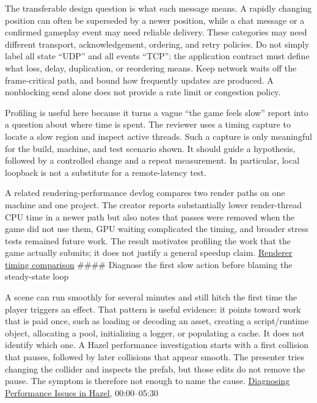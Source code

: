 The transferable design question is what each message means. A rapidly changing position can often be superseded by a newer position, while a chat message or a confirmed gameplay event may need reliable delivery. These categories may need different transport, acknowledgement, ordering, and retry policies. Do not simply label all state ``UDP'' and all events ``TCP'': the application contract must define what loss, delay, duplication, or reordering means. Keep network waits off the frame-critical path, and bound how frequently updates are produced. A nonblocking send alone does not provide a rate limit or congestion policy.

Profiling is useful here because it turns a vague ``the game feels slow'' report into a question about where time is spent. The reviewer uses a timing capture to locate a slow region and inspect active threads. Such a capture is only meaningful for the build, machine, and test scenario shown. It should guide a hypothesis, followed by a controlled change and a repeat measurement. In particular, local loopback is not a substitute for a remote-latency test.

A related rendering-performance devlog compares two render paths on one machine and one project. The creator reports substantially lower render-thread CPU time in a newer path but also notes that passes were removed when the game did not use them, GPU waiting complicated the timing, and broader stress tests remained future work. The result motivates profiling the work that the game actually submits; it does not justify a general speedup claim. \href{https://www.youtube.com/watch?v=ddfMzq0CNTw&t=11m16s}{Renderer timing comparison} \#\#\#\# Diagnose the first slow action before blaming the steady-state loop

A scene can run smoothly for several minutes and still hitch the first time the player triggers an effect. That pattern is useful evidence: it points toward work that is paid once, such as loading or decoding an asset, creating a script/runtime object, allocating a pool, initializing a logger, or populating a cache. It does not identify which one. A Hazel performance investigation starts with a first collision that pauses, followed by later collisions that appear smooth. The presenter tries changing the collider and inspects the prefab, but those edits do not remove the pause. The symptom is therefore not enough to name the cause. \href{https://www.youtube.com/watch?v=iY6QbL_3L2I}{Diagnosing Performance Issues in Hazel}, 00:00--05:30

